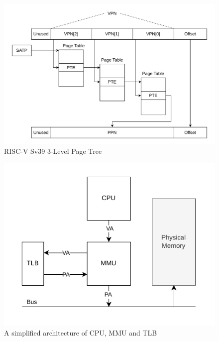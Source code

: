 \begin{figure}[t]
    \centering
    \includegraphics[scale=.8]{figures/VM-Tree.pdf}
    \caption[RISC-V Sv39 3-Level Page Tree]{RISC-V Sv39 3-Level Page Tree}
    \label{fig:fund:pagetree}
\end{figure}




\begin{figure}[t]
    \centering
    \includegraphics[]{figures/simple_mmu_arch.pdf}
    \caption[A simplified architecture of CPU, MMU and TLB]{A simplified architecture of CPU, MMU and TLB}
    \label{fig:fund:simplearch}
\end{figure}

